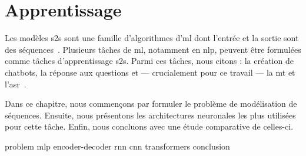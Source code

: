 \chapter{Apprentissage }%
\label{chap.s2s}

Les modèles \gls{s2s} sont une famille d'algorithmes d'\gls{ml}
dont l'entrée et la sortie sont des séquences~\cite{Martins_2018}.
Plusieurs tâches de \gls{ml}, notamment en \gls{nlp}, 
peuvent être formulées comme tâches d'apprentissage \gls{s2s}.
Parmi ces tâches, nous citons : la création de chatbots, la réponse aux questions
et --- crucialement pour ce travail --- la \gls{mt} et l'\gls{asr}~\cite{Fathi_2021}.

Dans ce chapitre, nous commençons par formuler le problème de modélisation de séquences.
Ensuite, nous présentons les architectures neuronales les plus utilisées pour cette tâche.
Enfin, nous concluons avec une étude comparative de celles-ci.

{problem}
{mlp}
{encoder-decoder}
{rnn}
{cnn}
{transformers}
{conclusion}
